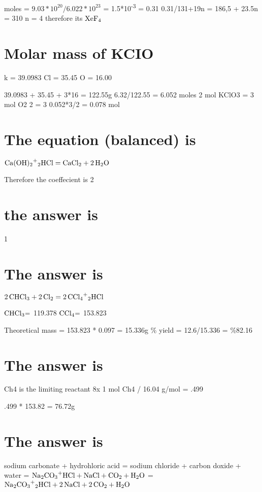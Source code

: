 \documentclass{scrartcl}
\begin{document}
moles = \(9.03*10^{20}/6.022*10^{23}\) = 1.5*10\textsuperscript{-3}
= 0.31
0.31/131+19n = 186,5 + 23.5n = 310
n = 4
therefore its \(\ce{XeF4}\)

\section{Molar mass of KCIO}
\label{sec:orga4f7c6f}

k = 39.0983
Cl = 35.45
O = 16.00

39.0983 + 35.45 + 3*16 = 122.55g
6.32/122.55 = 6.052 moles
2 mol KClO3 = 3 mol O2
2 = 3
0.052*3/2
= 0.078 mol

\section{The equation (balanced) is}
\label{sec:orga76d7fd}
\(\ce{Ca(OH)2+2HCl}=\ce{CaCl2 + 2H2O}\)

Therefore the coeffecient is 2

\section{the answer is}
\label{sec:org7ed573e}
1

\section{The answer is}
\label{sec:org41fc191}
\(\ce{2CHCl3 + 2Cl2}=\ce{2CCl4+2HCl}\)

\(\ce{CHCl3=}\) 119.378
\(\ce{CCl4=}\) 153.823

Theoretical mass = 153.823 * 0.097 = 15.336g
\% yield = 12.6/15.336 = \%82.16

\section{The answer is}
\label{sec:orgdb7dc1f}
Ch4 is the limiting reactant
8x 1 mol Ch4 / 16.04 g/mol = .499

.499 * 153.82 = 76.72g

\section{The answer is}
\label{sec:orgcff8923}
sodium carbonate + hydrohloric acid = sodium chloride + carbon doxide + water
= \(\ce{Na2CO3+HCl}+\ce{NaCl + CO2 + H2O}\)
= \(\ce{Na2CO3+2HCl}+\ce{2NaCl + 2CO2 + H2O}\)
\end{document}
